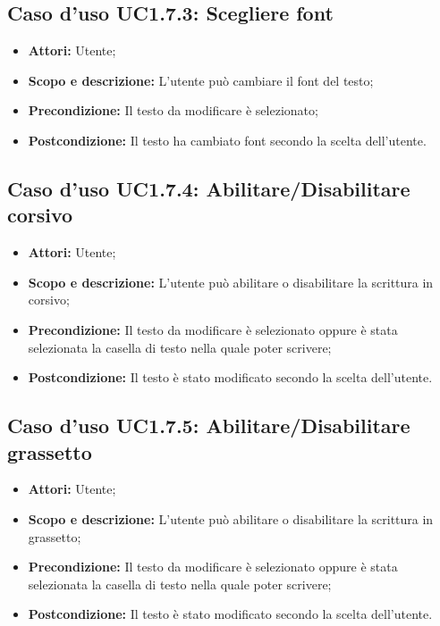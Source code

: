 \subsection{Caso d'uso UC1.7.3: Scegliere font}
\begin{itemize}
	\item \textbf{Attori:} Utente;
	\item \textbf{Scopo e descrizione:} L'utente può cambiare il \gls{font} del testo;
	\item \textbf{Precondizione:} Il testo da modificare è selezionato;
	\item \textbf{Postcondizione:} Il testo ha cambiato \gls{font} secondo la scelta dell'utente.
\end{itemize}

\subsection{Caso d'uso UC1.7.4: Abilitare/Disabilitare corsivo}
\begin{itemize}
	\item \textbf{Attori:} Utente;
	\item \textbf{Scopo e descrizione:} L'utente può abilitare o disabilitare la scrittura in corsivo;
	\item \textbf{Precondizione:} Il testo da modificare è selezionato oppure è stata selezionata la casella di testo nella quale poter scrivere;
	\item \textbf{Postcondizione:} Il testo è stato modificato secondo la scelta dell'utente.
\end{itemize}

\subsection{Caso d'uso UC1.7.5: Abilitare/Disabilitare grassetto}
\begin{itemize}
	\item \textbf{Attori:} Utente;
	\item \textbf{Scopo e descrizione:} L'utente può abilitare o disabilitare la scrittura in grassetto;
	\item \textbf{Precondizione:} Il testo da modificare è selezionato oppure è stata selezionata la casella di testo nella quale poter scrivere;
	\item \textbf{Postcondizione:} Il testo è stato modificato secondo la scelta dell'utente.
\end{itemize}

